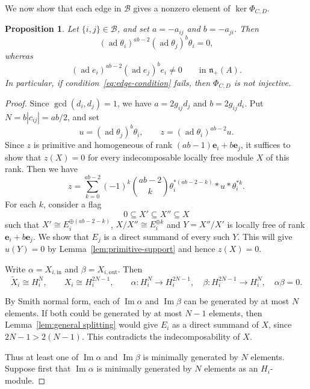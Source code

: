 \documentclass[12pt,reqno]{amsart}
\numberwithin{equation}{section}
\newtheorem{proposition}[theorem]{Proposition}
\theoremstyle{definition}
\theoremstyle{remark}
\newcommand{\ad}{\operatorname{ad}}
\renewcommand{\Im}{\operatorname{Im}}
\theoremstyle{plain}
\theoremstyle{plain}
\begin{document}
We now show that each edge in $\mathscr B$ gives a nonzero element of $\ker\Phi_{C,D}$.

\begin{proposition}\label{prop:app-extra-relations}
Let $\{i,j\}\in\mathscr B$, and set
$a=-a_{ij}$ and $b=-a_{ji}$. Then
\[
    (\ad\theta_i)^{ab-2}(\ad\theta_j)^b\theta_i=0,
\]
whereas
\[
    (\ad e_i)^{ab-2}(\ad e_j)^b e_i\ne0
    \qquad\text{in }\mathfrak n_+(A).
\]
In particular, if condition~\eqref{eq:edge-condition}
fails, then $\Phi_{C,D}$ is not injective.
\end{proposition}

\begin{proof}
    Since $\gcd(d_i,d_j)=1$, we have $a=2g_{ij}d_j$ and $b=2g_{ij}d_i$. Put $N=b|c_{ij}|=ab/2$, and set
    \[
    u=(\ad\theta_j)^b \theta_i, \qquad z=(\ad \theta_i)^{ab-2}u.
    \]
    Since $z$ is primitive and homogeneous of rank $(ab-1)\mathbf e_i+b\mathbf e_j$, it suffices to show that $z(X)=0$ for every indecomposable locally free module $X$ of this rank. Then we have
    \[
    z=\sum_{k=0}^{ab-2}(-1)^k\binom{ab-2}{k}\theta_i^{*(ab-2-k)}*u*\theta_i^{*k}.
    \]
    For each $k$, consider a flag
    \[
    0\subseteq X'\subseteq X''\subseteq X
    \]
such that $X'\cong E_i^{\oplus(ab-2-k)}$, $X/X''\cong E_i^{\oplus k}$ and $Y=X''/X'$ is locally free of rank $\mathbf e_i+b\mathbf e_j$. We show that $E_j$ is a direct summand of every such $Y$. This will give $u(Y)=0$ by Lemma~\ref{lem:primitive-support} and hence $z(X)=0$.

Write $\alpha=X_{i,\mathrm{in}}$ and $\beta=X_{i,\mathrm{out}}$. Then
     \[
     \widetilde X_i\cong H_i^N,\qquad X_i\cong H_i^{2N-1},
    \qquad
    \alpha:H_i^N\longrightarrow H_i^{2N-1},\quad
    \beta:H_i^{2N-1}\longrightarrow H_i^N,\quad
    \alpha\beta=0.
     \]

By Smith normal form, each of $\Im \alpha$ and $\Im \beta$ can be generated by at most $N$ elements. If both could be generated by at most $N-1$ elements, then Lemma~\ref{lem:general splitting} would give $E_i$ as a direct summand of $X$, since $2N-1>2(N-1)$. This contradicts the indecomposability of $X$.

Thus at least one of $\Im \alpha$ and $\Im \beta$ is minimally generated by $N$ elements. Suppose first that $\Im \alpha$ is minimally generated by $N$ elements as an $H_i$-module.


\end{proof}
\end{document}
